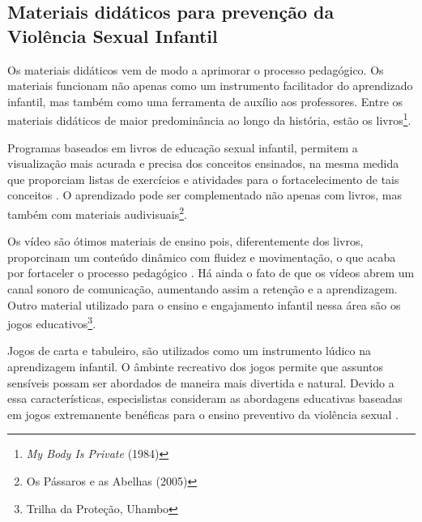 



\subsection{Materiais didáticos para prevenção da Violência Sexual Infantil}\label{ssec:resto}\vspace{-0.2cm}

Os materiais didáticos vem de modo a aprimorar o processo pedagógico. Os materiais funcionam não apenas como um instrumento facilitador do aprendizado infantil, mas também como uma ferramenta de auxílio aos professores. Entre os materiais didáticos de maior predominância ao longo da história, estão os livros\footnote{\textit{My Body Is Private} (1984)}.

Programas baseados em livros de educação sexual infantil, permitem a visualização mais acurada e precisa dos conceitos ensinados, na mesma medida que proporciam listas de exercícios e atividades para o fortacelecimento de tais conceitos \cite{maria2010papel}. O aprendizado pode ser complementado não apenas com livros, mas também com materiais audivisuais\footnote{Os Pássaros e as Abelhas (2005)}. 

Os vídeo são ótimos materiais de ensino pois, diferentemente dos livros, proporcinam um conteúdo dinâmico com fluidez e movimentação, o que acaba por fortaceler o processo pedagógico \cite{maria2010papel}. Há ainda o fato de que os vídeos abrem um canal sonoro de comunicação, aumentando assim a retenção e a aprendizagem. Outro material utilizado para o ensino e engajamento infantil nessa área são os jogos educativos\footnote{Trilha da Proteção, Uhambo}. 

Jogos de carta e tabuleiro, %
são utilizados como um instrumento lúdico na aprendizagem infantil. O âmbinte recreativo dos jogos permite que assuntos sensíveis possam ser abordados de maneira mais divertida e natural. Devido a essa características, especislistas consideram as abordagens educativas baseadas em jogos extremanente benéficas para o ensino preventivo da violência sexual \cite{meyer2017analise}.



